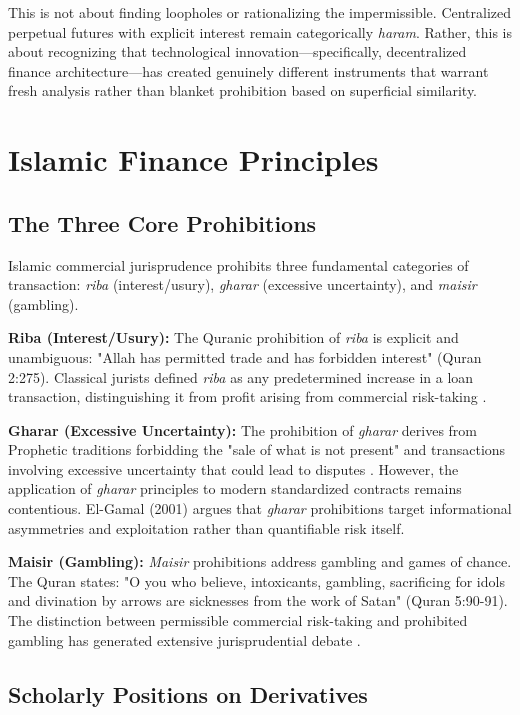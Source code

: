 \documentclass[10pt,twocolumn]{article}
\begin{document}
This is not about finding loopholes or rationalizing the impermissible. Centralized perpetual futures with explicit interest remain categorically \textit{haram}. Rather, this is about recognizing that technological innovation—specifically, decentralized finance architecture—has created genuinely different instruments that warrant fresh analysis rather than blanket prohibition based on superficial similarity.

\section{Islamic Finance Principles}

\subsection{The Three Core Prohibitions}

Islamic commercial jurisprudence prohibits three fundamental categories of transaction: \textit{riba} (interest/usury), \textit{gharar} (excessive uncertainty), and \textit{maisir} (gambling).

\textbf{Riba (Interest/Usury):} The Quranic prohibition of \textit{riba} is explicit and unambiguous: "Allah has permitted trade and has forbidden interest" (Quran 2:275). Classical jurists defined \textit{riba} as any predetermined increase in a loan transaction, distinguishing it from profit arising from commercial risk-taking \citep{ElGamal2006}.

\textbf{Gharar (Excessive Uncertainty):} The prohibition of \textit{gharar} derives from Prophetic traditions forbidding the "sale of what is not present" and transactions involving excessive uncertainty that could lead to disputes \citep{Kamali2000}. However, the application of \textit{gharar} principles to modern standardized contracts remains contentious. El-Gamal (2001) argues that \textit{gharar} prohibitions target informational asymmetries and exploitation rather than quantifiable risk itself.

\textbf{Maisir (Gambling):} \textit{Maisir} prohibitions address gambling and games of chance. The Quran states: "O you who believe, intoxicants, gambling, sacrificing for idols and divination by arrows are sicknesses from the work of Satan" (Quran 5:90-91). The distinction between permissible commercial risk-taking and prohibited gambling has generated extensive jurisprudential debate \citep{Ayub2007}.

\subsection{Scholarly Positions on Derivatives}
\end{document}
